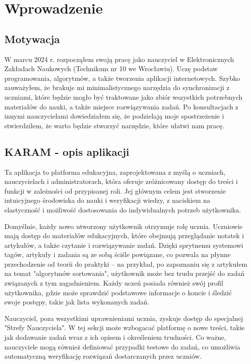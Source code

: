 \documentclass[shortabstract,inz]{iithesis}
\author         {Michał Hajahmadov}
\begin{document}

\chapter{Wprowadzenie}
\section{Motywacja}
W marcu 2024 r. rozpocząłem swoją pracę jako nauczyciel w Elektronicznych Zakładach Naukowych (Technikum nr 10 we Wrocławiu). Uczę podstaw programowania, algorytmów, a także tworzenia aplikacji internetowych. Szybko zauważyłem, że brakuje mi minimalistycznego narzędzia do synchronizacji z uczniami, które będzie mogło być traktowane jako zbiór wszystkich potrzebnych materiałów do nauki, a także miejsce rozwiązywania zadań. Po konsultacjach z innymi nauczycielami dowiedziałem się, że podzielają moje spostrzeżenie i stwierdziłem, że warto będzie stworzyć narzędzie, które ułatwi nam pracę.

\section{KARAM - opis aplikacji}
Ta aplikacja to platforma edukacyjna, zaprojektowana z myślą o uczniach, nauczycielach i administratorach, która oferuje zróżnicowany dostęp do treści i funkcji w zależności od przypisanej roli. Jej głównym celem jest stworzenie intuicyjnego środowiska do nauki i weryfikacji wiedzy, z naciskiem na elastyczność i możliwość dostosowania do indywidualnych potrzeb użytkownika.

Domyślnie, każdy nowo utworzony użytkownik otrzymuje rolę ucznia. Uczniowie mają dostęp do materiałów edukacyjnych, które obejmują przeglądanie notatek i artykułów, a także czytanie i rozwiązywanie zadań. Dzięki sprytnemu systemowi tagów, artykuły i zadania są ze sobą ściśle powiązane, co pozwala na płynne przechodzenie od teorii do praktyki – na przykład, po zapoznaniu się z artykułem na temat "algorytmów sortowania", użytkownik może bez trudu przejść do zadań związanych z tym zagadnieniem. Każdy uczeń posiada również swój profil użytkownika, gdzie może sprawdzić podstawowe informacje o koncie i śledzić swoje postępy, takie jak lista wykonanych zadań.

Nauczyciel, poza wszystkimi uprawnieniami ucznia, zyskuje dostęp do specjalnej "Strefy Nauczyciela". W tej sekcji może wzbogacać platformę o nowe treści, takie jak dodawanie zadań wraz z ich opisem i określeniem trudności. Co ważne, nauczyciele mogą również definiować przypadki testowe do zadań, co umożliwia automatyczną weryfikację rozwiązań dostarczanych przez uczniów.
\end{document}
